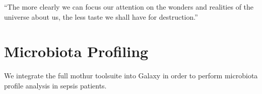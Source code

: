 \begin{savequote}[75mm]
“The more clearly we can focus our attention on the wonders and realities of the universe about us, the less taste we shall have for destruction.”
\end{savequote}

\chapter{Microbiota Profiling}\label{chapter:microbiota}
\setcounter{figure}{-1}
\setcounter{table}{-1}
\setcounter{section}{-1}

We integrate the full mothur toolsuite into Galaxy in order to perform microbiota profile analysis in sepsis patients.
